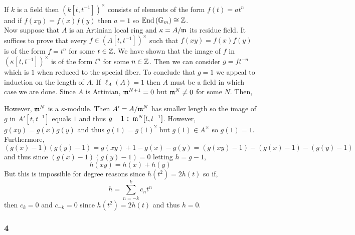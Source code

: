 \documentclass[12pt]{article}
\begin{document}
If $k$ is a field then $(k[t, t^{-1}])^\times$ consists of elements of the form $f(t) = a t^n$ and if $f(xy) = f(x) f(y)$ then $a = 1$ so $\mathrm{End}\left( \mathbb{G}_m \right) \cong \mathbb{Z}$.
\bigskip\\
Now suppose that $A$ is an Artinian local ring and $\kappa = A / \mathfrak{m}$ its residue field. It suffices to prove that every $f \in (A[t, t^{-1}])^\times$ such that $f(xy) = f(x) f(y)$ is of the form $f = t^n$ for some $t \in \mathbb{Z}$. We have shown that the image of $f$ in $(\kappa[t, t^{-1}])^\times$ is of the form $t^{n}$ for some $n \in \mathbb{Z}$. Then we can consider $g = f t^{-n}$ which is $1$ when reduced to the special fiber. To conclude that $g = 1$ we appeal to induction on the length of $A$. If $\ell_A(A) = 1$ then $A$ must be a field in which case we are done. Since $A$ is Artinian, $\mathfrak{m}^{N+1} = 0$ but $\mathfrak{m}^N \neq 0$ for some $N$. Then,
\begin{center}
\end{center}
However, $\mathfrak{m}^{N}$ is a $\kappa$-module. Then $A' = A / \mathfrak{m}^{N}$ has smaller length so the image of $g$ in $A'[t, t^{-1}]$ equals $1$ and thus $g - 1 \in \mathfrak{m}^{N}[t, t^{-1}]$. However, $g(xy) = g(x)g(y)$ and thus $g(1) = g(1)^2$ but $g(1) \in A^\times$ so $g(1) = 1$. Furthermore, 
\[ (g(x) - 1)(g(y) - 1) = g(xy) + 1 - g(x) - g(y) = (g(xy) - 1) - (g(x) - 1) - (g(y) - 1) \]
and thus since $(g(x) - 1)(g(y) - 1) = 0$ letting $h = g - 1$,
\[ h(xy) = h(x) + h(y) \]
But this is impossible for degree reasons since $h(t^2) = 2 h(t)$ so if,
\[ h = \sum_{n = -k}^k c_n t^n \]
then $c_k = 0$ and $c_{-k} = 0$ since $h(t^2) = 2 h(t)$ and thus $h = 0$.

\subsubsection{4}
\end{document}
